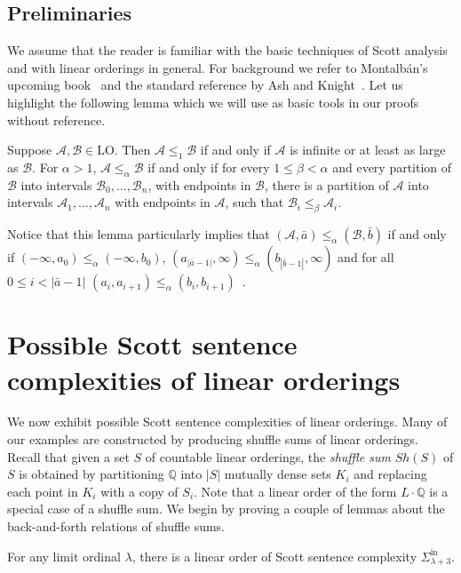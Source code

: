 \documentclass[10pt,a4paper]{amsart}
\providecommand{\A}{\mathcal{A}}
\providecommand{\B}{\mathcal{B}}
\providecommand{\Sinf}[1]{\Sigma^{\mathrm{in}}_{#1}}
\providecommand{\ba}{\bar a}
\providecommand{\bb}{\bar b}
\providecommand{\LO}{\mathrm{LO}}
\newcommand{\Q}{\mathbb{Q}}
\begin{document}
\subsection{Preliminaries}
We assume that the reader is familiar with the basic techniques of Scott
analysis and with linear orderings in general. For background we refer to
Montalb\'an's upcoming book~\cite{montalban2021} and the standard reference by
Ash and Knight~\cite{ash2000}. Let us highlight the following lemma
which we will use as basic tools in our proofs without reference.
\begin{lemma}\label{lem:bfandpartitions}  Suppose $\A,\B\in\LO$. Then $\A\leq_1 \B$ if and only if $\A$ is infinite or at least as large as $\B$. For $\alpha>1$, $\A\leq_\alpha \B$ if and only if for every $1\leq\beta<\alpha$ and every partition of $\B$ into intervals $\B_0,\dots,\B_n$, with endpoints in $\B$, there is a partition of $\A$ into intervals $\A_1,\dots,\A_n$ with endpoints in $\A$, such that $\B_i\leq_\beta \A_i$.
\end{lemma}
Notice that this lemma particularly implies that $(\A,\ba)\leq_\alpha (\B,\bb)$
if and only if $(-\infty, a_0)\leq_\alpha (-\infty, b_0)$,
$(a_{|\ba-1|},\infty)\leq_\alpha (b_{|\bb-1|},\infty)$ and for all $0\leq
i<|\ba-1|$ $(a_i,a_{i+1})\leq_\alpha (b_i,b_{i+1})$~\cite[Lemma 15.7]{ash2000}.

 \section{Possible Scott sentence complexities of linear orderings}\label{sec:ssc}
We now exhibit possible Scott sentence complexities of linear orderings. Many of
our examples are constructed by producing shuffle sums of linear orderings.
Recall that given a set $S$ of countable linear orderings, the \emph{shuffle
sum} $Sh(S)$ of $S$ is obtained by partitioning $\Q$ into $|S|$ mutually dense
sets $K_i$ and replacing each point in $K_i$ with a copy of $S_i$.
Note that a linear order of the form $L\cdot\Q$ is a special case of a shuffle
sum. We begin by proving a couple of lemmas about the back-and-forth relations
of shuffle sums.

\begin{theorem}\label{thm:Slim+3}
For any limit ordinal $\lambda$, there is a linear order of Scott sentence
complexity $\Sinf{\lambda+3}.$
\end{theorem}
\end{document}
